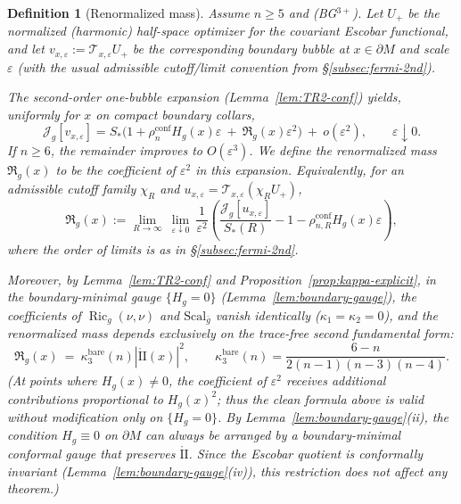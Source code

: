 \documentclass[11pt,reqno,a4paper]{amsart}
\numberwithin{equation}{section}
\theoremstyle{plain}
\newtheorem{definition}[theorem]{Definition}
\newcommand{\Scal}{\mathrm{Scal}}
\theoremstyle{remark}
\theoremstyle{plain}
\begin{document}
\begin{definition}[Renormalized mass]\label{def:Rg}
Assume $n\ge5$ and \textup{(BG$^{3+}$)}. Let $U_+$ be the normalized (harmonic) half-space optimizer for the covariant Escobar functional, and let
$v_{x,\varepsilon}:=\mathcal T_{x,\varepsilon}U_+$ be the corresponding boundary bubble at $x\in\partial M$ and scale $\varepsilon$ (with the usual admissible cutoff/limit convention from \S\ref{subsec:fermi-2nd}).

The second-order one-bubble expansion (Lemma~\ref{lem:TR2-conf}) yields, uniformly for $x$ on compact boundary collars,
\[
\mathcal J_g[v_{x,\varepsilon}]
= S_\ast\Big(1+\rho_n^{\mathrm{conf}}H_g(x)\varepsilon\ +\ \mathfrak{R}_g(x)\varepsilon^2\Big)\ +\ o(\varepsilon^2),
\qquad \varepsilon\downarrow0.
\]
If $n\ge6$, the remainder improves to $O(\varepsilon^3)$. We \emph{define} the \emph{renormalized mass} $\mathfrak R_g(x)$ to be the coefficient of $\varepsilon^2$ in this expansion.
Equivalently, for an admissible cutoff family $\chi_R$ and $u_{x,\varepsilon}=\mathcal T_{x,\varepsilon}(\chi_RU_+)$,
\[
\mathfrak R_g(x)
:=\lim_{R\to\infty}\ \lim_{\varepsilon\downarrow0}\
\frac{1}{\varepsilon^2}\left(\frac{\mathcal J_g[u_{x,\varepsilon}]}{S_\ast(R)}-1-\rho^{\mathrm{conf}}_{n,R}H_g(x)\varepsilon\right),
\]
where the order of limits is as in \S\ref{subsec:fermi-2nd}.

Moreover, by Lemma~\ref{lem:TR2-conf} and Proposition~\ref{prop:kappa-explicit},
in the boundary-minimal gauge $\{H_g=0\}$ (Lemma~\ref{lem:boundary-gauge}), the coefficients of
$\operatorname{Ric}_g(\nu,\nu)$ and $\Scal_{\bar g}$ vanish identically
($\kappa_1=\kappa_2=0$), and the renormalized mass depends exclusively
on the trace-free second fundamental form:
\[
\mathfrak{R}_g(x)\ =\ \kappa_3^{\mathrm{bare}}(n)|\mathring{\mathrm{II}}(x)|^2,
\qquad
\kappa_3^{\mathrm{bare}}(n) = \frac{6-n}{2(n-1)(n-3)(n-4)}.
\]
(At points where $H_g(x)\neq0$, the coefficient of $\varepsilon^2$ receives additional
contributions proportional to $H_g(x)^2$; thus the clean formula above
is valid without modification only on $\{H_g=0\}$.
By Lemma~\ref{lem:boundary-gauge}(ii), the condition $H_g\equiv0$ on $\partial M$
can always be arranged by a boundary-minimal conformal gauge that preserves
$\mathring{\mathrm{II}}$.
Since the Escobar quotient is conformally invariant
(Lemma~\ref{lem:boundary-gauge}(iv)),
this restriction does not affect any theorem.)


\end{definition}
\end{document}
